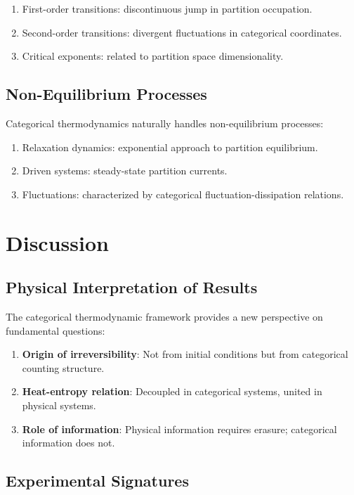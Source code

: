 \documentclass[twocolumn,10pt]{article}
\begin{document}
\begin{enumerate}
    \item First-order transitions: discontinuous jump in partition occupation.
    \item Second-order transitions: divergent fluctuations in categorical coordinates.
    \item Critical exponents: related to partition space dimensionality.
\end{enumerate}

\subsection{Non-Equilibrium Processes}

Categorical thermodynamics naturally handles non-equilibrium processes:

\begin{enumerate}
    \item Relaxation dynamics: exponential approach to partition equilibrium.
    \item Driven systems: steady-state partition currents.
    \item Fluctuations: characterized by categorical fluctuation-dissipation relations.
\end{enumerate}

\section{Discussion}

\subsection{Physical Interpretation of Results}

The categorical thermodynamic framework provides a new perspective on fundamental questions:

\begin{enumerate}
    \item \textbf{Origin of irreversibility}: Not from initial conditions but from categorical counting structure.
    \item \textbf{Heat-entropy relation}: Decoupled in categorical systems, united in physical systems.
    \item \textbf{Role of information}: Physical information requires erasure; categorical information does not.
\end{enumerate}

\subsection{Experimental Signatures}
\end{document}

